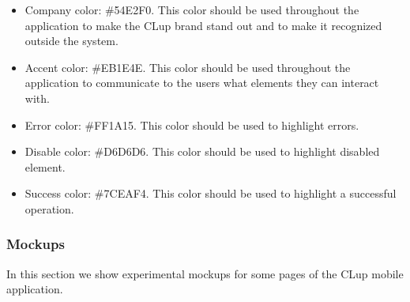 \begin{itemize}[topsep=0pt]
    \item Company color: \#54E2F0. This color should be used throughout the application to make the CLup brand stand out and to make it recognized outside the system.
    \item Accent color: \#EB1E4E. This color should be used throughout the application to communicate to the users what elements they can interact with.
    \item Error color: \#FF1A15. This color should be used to highlight errors.
    \item Disable color: \#D6D6D6. This color should be used to highlight disabled element.
    \item Success color: \#7CEAF4. This color should be used to highlight a successful operation.
\end{itemize}

\subsubsection{Mockups}
\label{subsubsect:mockups}

In this section we show experimental mockups for some pages of the CLup mobile application.

